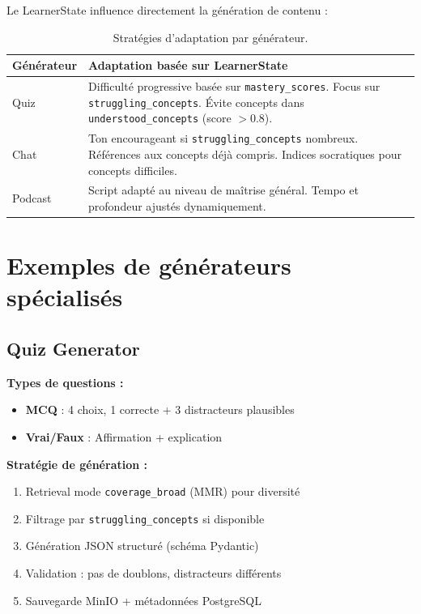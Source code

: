 \documentclass[12pt,a4paper]{article}
\begin{document}
Le LearnerState influence directement la génération de contenu :

\begin{table}[H]
    \centering
    \small
    \begin{tabularx}{\textwidth}{@{}lX@{}}
        \toprule
        \textbf{Générateur} & \textbf{Adaptation basée sur LearnerState} \\
        \midrule
        Quiz & Difficulté progressive basée sur \texttt{mastery\_scores}. Focus sur \texttt{struggling\_concepts}. Évite concepts dans \texttt{understood\_concepts} (score $> 0.8$). \\
        \addlinespace
        Chat & Ton encourageant si \texttt{struggling\_concepts} nombreux. Références aux concepts déjà compris. Indices socratiques pour concepts difficiles. \\
        \addlinespace
        Podcast & Script adapté au niveau de maîtrise général. Tempo et profondeur ajustés dynamiquement. \\
        \bottomrule
    \end{tabularx}
    \caption{Stratégies d'adaptation par générateur.}
\end{table}

\section{Exemples de générateurs spécialisés}

\subsection{Quiz Generator}

\textbf{Types de questions :}
\begin{itemize}
    \item \textbf{MCQ} : 4 choix, 1 correcte + 3 distracteurs plausibles
    \item \textbf{Vrai/Faux} : Affirmation + explication
\end{itemize}

\textbf{Stratégie de génération :}
\begin{enumerate}
    \item Retrieval mode \texttt{coverage\_broad} (MMR) pour diversité
    \item Filtrage par \texttt{struggling\_concepts} si disponible
    \item Génération JSON structuré (schéma Pydantic)
    \item Validation : pas de doublons, distracteurs différents
    \item Sauvegarde MinIO + métadonnées PostgreSQL
\end{enumerate}
\end{document}
